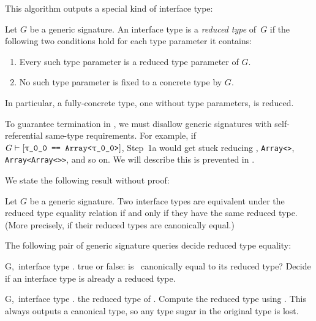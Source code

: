 \documentclass[../generics]{subfiles}
\begin{document}
This algorithm outputs a special kind of interface type:

\begin{definition}
Let $G$ be a generic signature. An interface type is a \emph{reduced type} of~$G$ if the following two conditions hold for each type parameter it contains:
\begin{enumerate}
\item Every such type parameter is a reduced type parameter of $G$.
\item No such type parameter is fixed to a concrete type by $G$.
\end{enumerate}
In particular, a fully-concrete type, one without type parameters, is reduced.
\end{definition}

To guarantee termination in , we must disallow generic signatures with self-referential same-type requirements. For example, if $G\vdash\SameReq{\rT}{Array<\rT>}$, Step~1a would get stuck reducing \rT, \texttt{Array<\rT>}, \texttt{Array<Array<\rT>>}, and so on. We will describe this is prevented in .

We state the following result without proof:

\begin{proposition}
Let $G$ be a generic signature. Two interface types are equivalent under the reduced type equality relation if and only if they have the same reduced type. (More precisely, if their reduced types are canonically equal.)
\end{proposition}
The following pair of generic signature queries decide reduced type equality:
\begin{itemize}
{G,\,\tT}
{interface type \tT.}
{true or false: is \tT\ canonically equal to its reduced type?}
{Decide if an interface type is already a reduced type.}

{G,\,\tT}
{interface type \tT.}
{the reduced type of \tT.}
{Compute the reduced type using . This always outputs a canonical type, so any type sugar in the original type is lost.}
\end{itemize}
\end{document}

